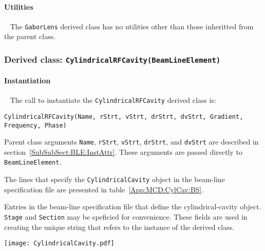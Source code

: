 \paragraph{Utilities} ~\newline
\noindent
The \texttt{GaborLens} derived class has no utilities other
than those inheritted from the parent class. 

\FloatBarrier

\subsubsection{Derived class: \texttt{CylindricalRFCavity(BeamLineElement)}}

\paragraph{Instantiation} ~\newline
\noindent
The call to instantiate the \texttt{CylindricalRFCavity} derived class is:
\begin{center}
  \texttt{CylindricalRFCavity(Name, rStrt, vStrt, drStrt, dvStrt,
          Gradient, Frequency, Phase)}
\end{center}
Parent class arguments \texttt{Name}, \texttt{rStrt}, \texttt{vStrt},
\texttt{drStrt}, and \texttt{dvStrt} are described in
section~\ref{SubSubSect:BLE:InstAttr}.
These arguments are passed directly to \texttt{BeamLineElement}.

The lines that specify the \texttt{CylindricalCavity} object in the
beam-line specification file are presented in
table~\ref{App:MCD:CylCav:BS}. 
\begin{table}[h]
  \caption{
    Entries in the beam-line specification file that define the
    cylindrical-cavity object.
    \texttt{Stage} and \texttt{Section} may be speficied for
    convenience.
    These fields are used in creating the unique string that refers
    to the instance of the derived class.
  }
  \label{App:MCD:CylCav:BS}
  \begin{center}
    \texttt{[image: CylindricalCavity.pdf]}
  \end{center}
\end{table}

